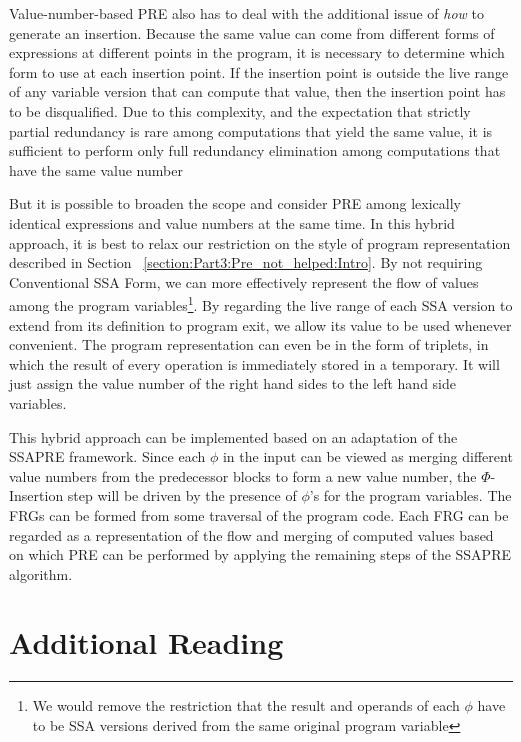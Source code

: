 Value-number-based PRE also has to deal with the additional issue of \emph{how}
to generate an insertion.  Because the same value can come from different forms
of expressions at different points in the program, it is necessary to determine
which form to use at each insertion point.  If the insertion point is outside 
the live range of any variable version that can compute that value, then the
insertion point has to be disqualified.  Due to this complexity, and the
expectation that strictly partial redundancy is rare among computations
that yield the same value, it is sufficient to perform only full redundancy
elimination among computations that have the same value number

But it is possible to broaden the scope and
consider PRE among lexically identical expressions and value 
numbers at the same time.  In this hybrid approach, it is best to relax our 
restriction on the style of program representation described in 
Section~ \ref{section:Part3:Pre_not_helped:Intro}.  By not requiring
Conventional SSA Form, we can more effectively represent the flow of values
among the program variables\footnote{We would remove the restriction that the 
result and operands of each $\phi$ have to be SSA versions derived from the same
original program variable}.  By regarding the live range of each SSA version
to extend from its definition to program exit, we allow its value to be used
whenever convenient.  The program representation can even be in the form of
triplets, in which the result of every operation is immediately stored in a
temporary.  It will just assign the value number of the right 
hand sides to the left hand side variables.

This hybrid approach can be implemented based on an adaptation of the SSAPRE 
framework.  Since each $\phi$ in the input can be viewed as merging different 
value numbers from the predecessor blocks to form a new value number, the 
$\Phi$-Insertion
step will be driven by the presence of $\phi$'s for the program variables.
The FRGs can be formed from some traversal of the program code.
Each FRG can be regarded as a representation of the flow and merging of
computed values based on which PRE can be performed by applying the remaining 
steps of the SSAPRE algorithm.

\section{Additional Reading}

